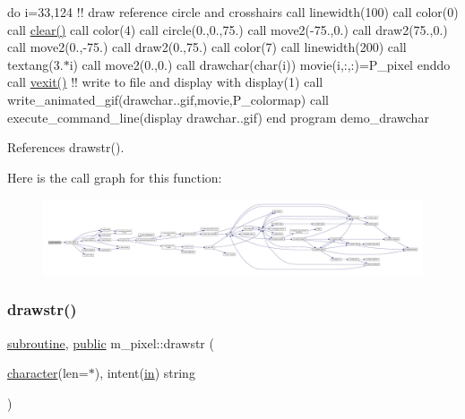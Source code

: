 do i=33,124 !! draw reference circle and crosshairs call linewidth(100) call color(0) call \hyperlink{namespacem__pixel_af3b81a21a0b2f6b5eddd09c031bd6173}{clear()} call color(4) call circle(0.,0.,75.) call move2(-\/75.,0.) call draw2(75.,0.) call move2(0.,-\/75.) call draw2(0.,75.) call color(7) call linewidth(200) call textang(3.$\ast$i) call move2(0.,0.) call drawchar(char(i)) movie(i,\+:,\+:)=P\+\_\+pixel enddo call \hyperlink{namespacem__pixel_a19ad6b65752322b0029a62cc0ebec3e8}{vexit()} !! write to file and display with display(1) call write\+\_\+animated\+\_\+gif(\textquotesingle{}drawchar..\+gif\textquotesingle{},movie,P\+\_\+colormap) call execute\+\_\+command\+\_\+line(\textquotesingle{}display drawchar..\+gif\textquotesingle{}) end program demo\+\_\+drawchar 

References drawstr().

Here is the call graph for this function\+:
\nopagebreak
\begin{figure}[H]
\begin{center}
\leavevmode
\includegraphics[width=350pt]{namespacem__pixel_a58406ffd6c2a9fdf2ea7772198b54255_cgraph}
\end{center}
\end{figure}
\mbox{\label{namespacem__pixel_a6fa0c2d531d1ac74840aa2f0e2b050e0}} 
\subsubsection{\texorpdfstring{drawstr()}{drawstr()}}
{\footnotesize\ttfamily \hyperlink{M__stopwatch_83_8txt_acfbcff50169d691ff02d4a123ed70482}{subroutine}, \hyperlink{M__stopwatch_83_8txt_a2f74811300c361e53b430611a7d1769f}{public} m\+\_\+pixel\+::drawstr (\begin{DoxyParamCaption}\item[{\hyperlink{option__stopwatch_83_8txt_abd4b21fbbd175834027b5224bfe97e66}{character}(len=$\ast$), intent(\hyperlink{M__journal_83_8txt_afce72651d1eed785a2132bee863b2f38}{in})}]{string }\end{DoxyParamCaption})}



